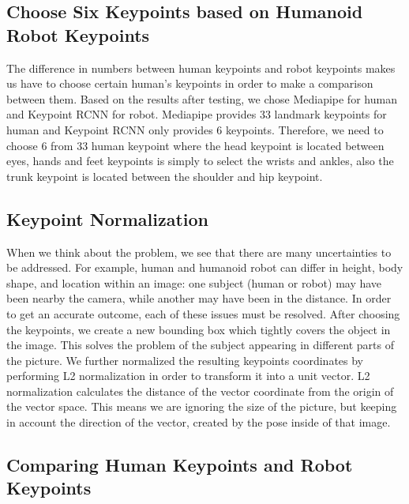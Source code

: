 \subsection{Choose Six Keypoints based on Humanoid Robot Keypoints}
\label{subsec:choose-keypoints}

The difference in numbers between human keypoints and robot keypoints makes us have to choose certain human's keypoints in order to make a comparison between them.
Based on the results after testing, we chose Mediapipe for human and Keypoint RCNN for robot. Mediapipe provides 33 landmark keypoints for human and Keypoint RCNN only provides 6 keypoints.
Therefore, we need to choose 6 from 33 human keypoint where the head keypoint is located between eyes, hands and feet keypoints is simply to select the wrists and ankles, also the trunk keypoint is located between the shoulder and hip keypoint.


\subsection{Keypoint Normalization}
\label{subsec:keypoint-normalization}

When we think about the problem, we see that there are many uncertainties to be addressed. For example, human and humanoid robot can differ in height, body shape, and location within an image: one subject (human or robot) may have been nearby the camera,
while another may have been in the distance. In order to get an accurate outcome, each of these issues must be resolved.
After choosing the keypoints, we create a new bounding box which tightly covers the object in the image.
This solves the problem of the subject appearing in different parts of the picture.
We further normalized the resulting keypoints coordinates by performing L2 normalization in order to transform it into a unit vector.
L2 normalization calculates the distance of the vector coordinate from the origin of the vector space.
This means we are ignoring the size of the picture, but keeping in account the direction of the vector, created by the pose inside of that image.


\subsection{Comparing Human Keypoints and Robot Keypoints}
\label{subsec:comparing-keypoints}

